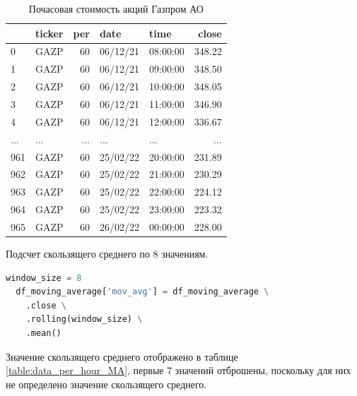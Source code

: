 \documentclass[14pt,a4paper]{extarticle}%
\begin{document}
\begin{table}[H]
  \centering
  \begin{tabular}{llrllr}
    \toprule
    {} & ticker &  per &      date &      time &   close \\
    \midrule
    0    &  GAZP  &  60   &  06/12/21  &  08:00:00  &  348.22 \\
    1    &  GAZP  &  60   &  06/12/21  &  09:00:00  &  348.50 \\
    2    &  GAZP  &  60   &  06/12/21  &  10:00:00  &  348.05 \\
    3    &  GAZP  &  60   &  06/12/21  &  11:00:00  &  346.90 \\
    4    &  GAZP  &  60   &  06/12/21  &  12:00:00  &  336.67 \\
    ...  &  ...   &  ...  &    ...     &     ...    &   ...   \\
    961  &  GAZP  &  60   &  25/02/22  &  20:00:00  &  231.89 \\
    962  &  GAZP  &  60   &  25/02/22  &  21:00:00  &  230.29 \\
    963  &  GAZP  &  60   &  25/02/22  &  22:00:00  &  224.12 \\
    964  &  GAZP  &  60   &  25/02/22  &  23:00:00  &  223.32 \\
    965  &  GAZP  &  60   &  26/02/22  &  00:00:00  &  228.00 \\
    \bottomrule
  \end{tabular}
  \caption{Почасовая стоимость акций Газпром АО}
  \label{table:data_per_hour}
\end{table}

\pagebreak
Подсчет скользящего среднего по 8 значениям.

\begin{lstlisting}[basicstyle=\small, language=Python]
  window_size = 8
  df_moving_average['mov_avg'] = df_moving_average \
    .close \
    .rolling(window_size) \
    .mean()
\end{lstlisting}

Значение скользящего среднего отображено в таблице \ref{table:data_per_hour_MA},
первые 7 значений отброшены, поскольку для них не определено значение скользящего среднего.
\end{document}
